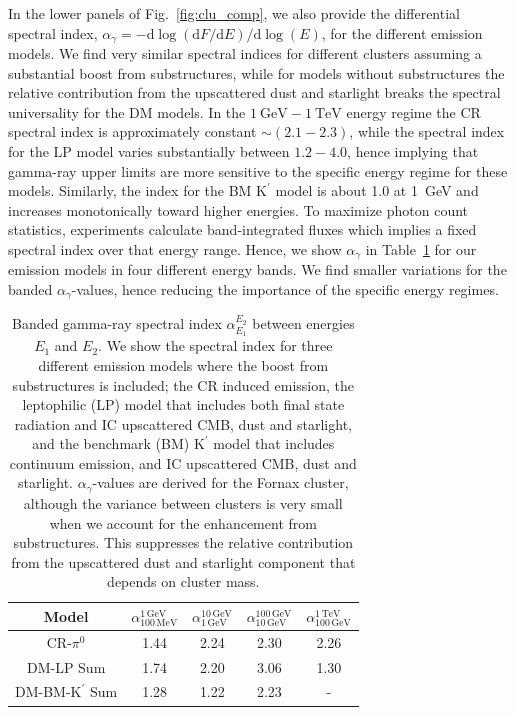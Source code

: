 \documentclass[10pt,aps,pra,reprint,amsmath,amsfonts,amssymb,showpacs,nofootinbib,floatfix]{revtex4-1}
\newcommand{\rmn}{\mathrm}
\newcommand{\Kp}{\rmn{K}^\prime}
\newcommand{\gev}{\rmn{GeV}}
\newcommand{\tev}{\rmn{TeV}}
\newcommand{\dd}{\rmn{d}}
\begin{document}
In the lower panels of Fig.~\ref{fig:clu_comp}, we also provide the
differential spectral index, $\alpha_\gamma=-\dd \log(\dd F/\dd E)/\dd
\log(E)$, for the different emission models. We find very similar
spectral indices for different clusters assuming a substantial boost
from substructures, while for models without substructures the
relative contribution from the upscattered dust and starlight breaks
the spectral universality for the DM models. In the $1~\gev-1~\tev$
energy regime the CR spectral index is approximately constant $\sim
(2.1-2.3)$, while the spectral index for the LP model varies
substantially between $1.2-4.0$, hence implying that gamma-ray upper
limits are more sensitive to the specific energy regime for these
models. Similarly, the index for the BM $\Kp$ model is about 1.0 at
1~GeV and increases monotonically toward higher energies. To maximize
photon count statistics, experiments calculate band-integrated fluxes
which implies a fixed spectral index over that energy range. Hence, we
show $\alpha_\gamma$ in Table~\ref{tab:spectral_index} for our
emission models in four different energy bands. We find smaller
variations for the banded $\alpha_\gamma$-values, hence reducing the
importance of the specific energy regimes.

\begin{table}
\begin{tabular}{ccccc}
\hline\hline
      Model & $\alpha_{100\,\rmn{MeV}}^{1\,\rmn{GeV}}$ &
              $\alpha_{1\,\rmn{GeV}}^{10\,\rmn{GeV}}$ &
              $\alpha_{10\,\rmn{GeV}}^{100\,\rmn{GeV}}$ &
              $\alpha_{100\,\rmn{GeV}}^{1\,\rmn{TeV}}$ \\
\hline
CR-$\pi^0$ & 1.44 & 2.24 & 2.30 & 2.26 \\
DM-LP Sum & 1.74 & 2.20 & 3.06 & 1.30 \\
DM-BM-$\Kp$ Sum & 1.28 & 1.22 & 2.23 & - \\
\hline\hline
\end{tabular}
\caption{Banded gamma-ray spectral index $\alpha_{E_1}^{E_2}$ between
  energies $E_1$ and $E_2$. We show the spectral index for three
  different emission models where the boost from substructures is
  included; the CR induced emission, the leptophilic (LP) model that
  includes both final state radiation and IC upscattered CMB, dust and
  starlight, and the benchmark (BM) $\Kp$ model that includes
  continuum emission, and IC upscattered CMB, dust and
  starlight. $\alpha_\gamma$-values are derived for the Fornax
  cluster, although the variance between clusters is very small when
  we account for the enhancement from substructures. This suppresses
  the relative contribution from the upscattered dust and starlight
  component that depends on cluster mass. \label{tab:spectral_index}}
\end{table}
\end{document}
